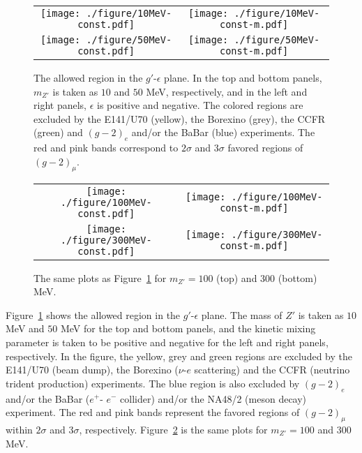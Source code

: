 \documentclass[preprint,amsmath,amssymb,superscriptaddress,nofootinbib]{revtex4}
\begin{document}
\begin{figure}[t]
\begin{center}
\begin{tabular}{cc}
\texttt{[image: ./figure/10MeV-const.pdf]}
&
\texttt{[image: ./figure/10MeV-const-m.pdf]} \\
%
\texttt{[image: ./figure/50MeV-const.pdf]}
&
\texttt{[image: ./figure/50MeV-const-m.pdf]} 
\end{tabular}
\end{center}
\caption{ 
The allowed region in the $g'$-$\epsilon$ plane. In the top and bottom panels, $m_{Z'}$ is taken as $10$ and $50$ MeV, 
respectively, and in the left and right panels, $\epsilon$ is positive and negative. The colored regions are excluded 
by the E141/U70 (yellow), the Borexino (grey), the CCFR (green) and $(g-2)_e$ and/or the BaBar (blue) experiments. 
The red and pink bands correspond to $2\sigma$ and $3\sigma$ favored regions of $(g-2)_\mu$.
}
\label{fig:allowed-region1}
\end{figure}


\begin{figure}[t]
\begin{center}
\begin{tabular}{cc}
\texttt{[image: ./figure/100MeV-const.pdf]}
&
\texttt{[image: ./figure/100MeV-const-m.pdf]} \\
%
\texttt{[image: ./figure/300MeV-const.pdf]}
&
\texttt{[image: ./figure/300MeV-const-m.pdf]} 
%
\end{tabular}
\end{center}
\caption{ 
The same plots as Figure~\ref{fig:allowed-region1} for $m_{Z'}=100$ (top) and $300$ (bottom) MeV.
}
\label{fig:allowed-region2}
\end{figure}



Figure~\ref{fig:allowed-region1} shows the allowed region in the $g'$-$\epsilon$ plane. The mass of $Z'$ is taken 
as $10$ MeV and $50$ MeV for the top and bottom panels, and the kinetic mixing parameter is taken to be positive and negative 
for the left and right panels, respectively. 
In the figure, the yellow, grey and green regions are excluded by the E141/U70 (beam dump), 
the Borexino ($\nu$-$e$ scattering) and the CCFR (neutrino trident production) experiments. The blue region is 
also excluded by $(g-2)_e$ and/or the BaBar ($e^+$- $e^-$ collider) and/or the NA48/2 (meson decay) experiment.  
The red and pink bands represent the favored regions 
of $(g-2)_\mu$ within $2\sigma$ and $3\sigma$, respectively. Figure~\ref{fig:allowed-region2} is the same plots 
for $m_{Z'}=100$ and $300$ MeV. 
\end{document}
